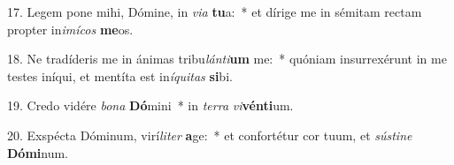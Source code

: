 17. Legem pone mihi, Dómine, in \textit{vi}\textit{a} \textbf{tu}a:~*  et dírige me in sémitam rectam propter in\textit{i}\textit{mí}\textit{cos} \textbf{me}os.\

18. Ne tradíderis me in ánimas tribu\textit{lán}\textit{ti}\textbf{um} me:~*  quóniam insurrexérunt in me testes iníqui, et mentíta est in\textit{í}\textit{qui}\textit{tas} \textbf{si}bi.\

19. Credo vidére \textit{bo}\textit{na} \textbf{Dó}mini~*  in \textit{ter}\textit{ra} \textit{vi}\textbf{vén}\textbf{ti}um.\

20. Exspécta Dóminum, virí\textit{li}\textit{ter} \textbf{a}ge:~*  et confortétur cor tuum, et \textit{sús}\textit{ti}\textit{ne} \textbf{Dó}\textbf{mi}num.\

